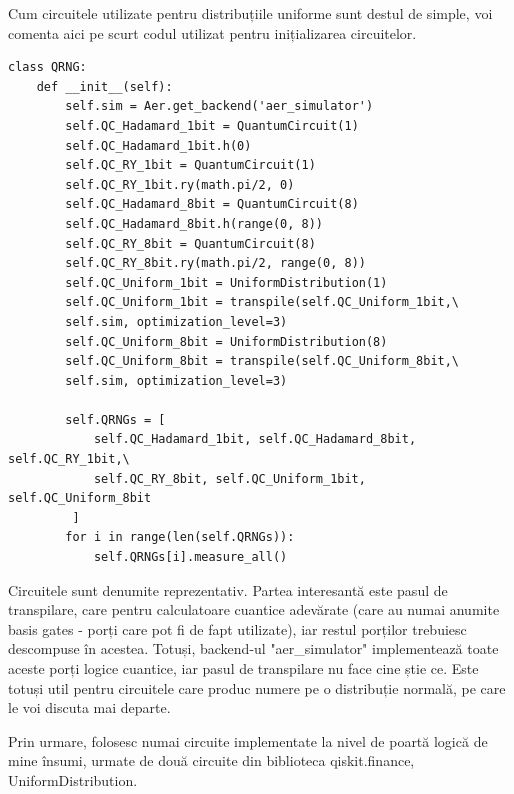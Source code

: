 Cum circuitele utilizate pentru distribuțiile uniforme sunt destul de simple, voi comenta aici pe scurt codul utilizat pentru inițializarea circuitelor.
\begin{code}
\begin{verbatim}
class QRNG:
    def __init__(self):
        self.sim = Aer.get_backend('aer_simulator')
        self.QC_Hadamard_1bit = QuantumCircuit(1)
        self.QC_Hadamard_1bit.h(0)
        self.QC_RY_1bit = QuantumCircuit(1)
        self.QC_RY_1bit.ry(math.pi/2, 0)
        self.QC_Hadamard_8bit = QuantumCircuit(8)
        self.QC_Hadamard_8bit.h(range(0, 8))
        self.QC_RY_8bit = QuantumCircuit(8)
        self.QC_RY_8bit.ry(math.pi/2, range(0, 8))
        self.QC_Uniform_1bit = UniformDistribution(1)
        self.QC_Uniform_1bit = transpile(self.QC_Uniform_1bit,\
        self.sim, optimization_level=3)
        self.QC_Uniform_8bit = UniformDistribution(8)
        self.QC_Uniform_8bit = transpile(self.QC_Uniform_8bit,\
        self.sim, optimization_level=3)
        
        self.QRNGs = [
            self.QC_Hadamard_1bit, self.QC_Hadamard_8bit, self.QC_RY_1bit,\
            self.QC_RY_8bit, self.QC_Uniform_1bit, self.QC_Uniform_8bit
         ]
        for i in range(len(self.QRNGs)):
            self.QRNGs[i].measure_all()
\end{verbatim}
\end{code}

Circuitele sunt denumite reprezentativ. Partea interesantă este pasul de transpilare, care pentru calculatoare cuantice adevărate (care au numai anumite basis gates - porți care pot fi de fapt utilizate), iar restul porților trebuiesc descompuse în acestea. Totuși, backend-ul "aer\_simulator" implementează toate aceste porți logice cuantice, iar pasul de transpilare nu face cine știe ce. Este totuși util pentru circuitele care produc numere pe o distribuție normală, pe care le voi discuta mai departe.

Prin urmare, folosesc numai circuite implementate la nivel de poartă logică de mine însumi, urmate de două circuite din biblioteca qiskit.finance, UniformDistribution.

